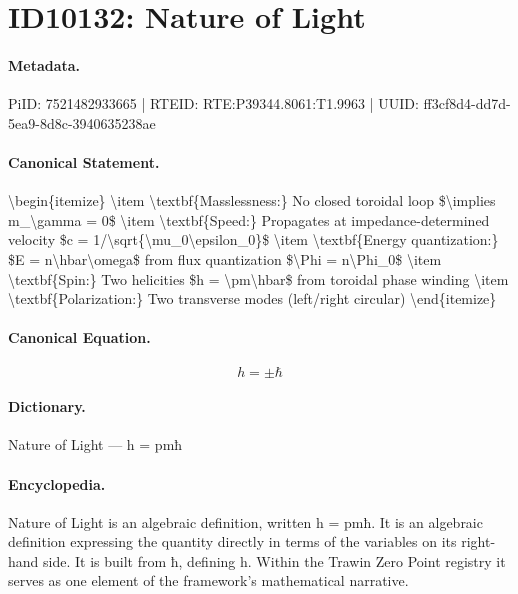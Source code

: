 \section*{ID10132: Nature of Light}
\paragraph{Metadata.}
PiID: 7521482933665 | RTEID: RTE:P39344.8061:T1.9963 | UUID: ff3cf8d4-dd7d-5ea9-8d8c-3940635238ae

\paragraph{Canonical Statement.}
\textbackslash{}begin\{itemize\} \textbackslash{}item \textbackslash{}textbf\{Masslessness:\} No closed toroidal loop \$\textbackslash{}implies m\_\textbackslash{}gamma = 0\$ \textbackslash{}item \textbackslash{}textbf\{Speed:\} Propagates at impedance-determined velocity \$c = 1/\textbackslash{}sqrt\{\textbackslash{}mu\_0\textbackslash{}epsilon\_0\}\$ \textbackslash{}item \textbackslash{}textbf\{Energy quantization:\} \$E = n\textbackslash{}hbar\textbackslash{}omega\$ from flux quantization \$\textbackslash{}Phi = n\textbackslash{}Phi\_0\$ \textbackslash{}item \textbackslash{}textbf\{Spin:\} Two helicities \$h = \textbackslash{}pm\textbackslash{}hbar\$ from toroidal phase winding \textbackslash{}item \textbackslash{}textbf\{Polarization:\} Two transverse modes (left/right circular) \textbackslash{}end\{itemize\}

\paragraph{Canonical Equation.}
\[
h = \pm\hbar
\]

\paragraph{Dictionary.}
Nature of Light — h = pmħ

\paragraph{Encyclopedia.}
Nature of Light is an algebraic definition, written h = pmħ. It is an algebraic definition expressing the quantity directly in terms of the variables on its right-hand side. It is built from ħ, defining h. Within the Trawin Zero Point registry it serves as one element of the framework's mathematical narrative.

